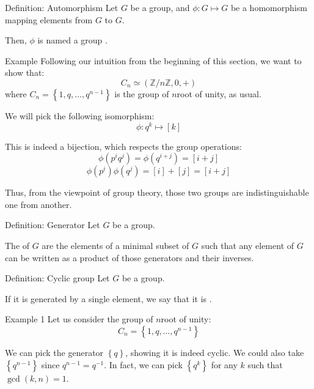 \documentclass[a4paper]{article}
\begin{document}
\begin{parag}{Definition: Automorphism}
    Let $G$ be a group, and $\phi : G \mapsto G$ be a homomorphism mapping elements from $G$ to $G$. 

    Then, $\phi$ is named a group .
\end{parag}

\begin{parag}{Example}
    Following our intuition from the beginning of this section, we want to show that: 
    \[C_n \simeq \left(\mathbb{Z}/n\mathbb{Z}, 0, +\right)\]
    where $C_n = \left\{1, q, \ldots, q^{n-1}\right\} $ is the group of $n$\Th root of unity, as usual.

    We will pick the following isomorphism: 
    \[\phi: q^k \mapsto \left[k\right]\]

    This is indeed a bijection, which respects the group operations: 
    \[\phi\left(p^i q^j\right) = \phi\left(q^{i+j}\right) = \left[i+j\right]\]
    \[\phi\left(p^i\right)\phi\left(q^j\right) = \left[i\right] + \left[j\right] = \left[i + j\right]\]
    
    Thus, from the viewpoint of group theory, those two groups are indistinguishable one from another.
\end{parag}

\begin{parag}{Definition: Generator}
    Let $G$ be a group.

    The  of $G$ are the elements of a minimal subset of $G$ such that any element of $G$ can be written as a product of those generators and their inverses. 
\end{parag}

\begin{parag}{Definition: Cyclic group}
    Let $G$ be a group. 

    If it is generated by a single element, we say that it is .
\end{parag}

\begin{parag}{Example 1}
    Let us consider the group of $n$\Th root of unity: 
    \[C_n = \left\{1, q, \ldots, q^{n-1}\right\}\]
    
    We can pick the generator $\left\{q\right\}$, showing it is indeed cyclic. We could also take $\left\{q^{n-1}\right\}$ since $q^{n-1} = q^{-1}$. In fact, we can pick $\left\{q^k\right\}$ for any $k$ such that $\gcd\left(k, n\right) = 1$.
\end{parag}
\end{document}

